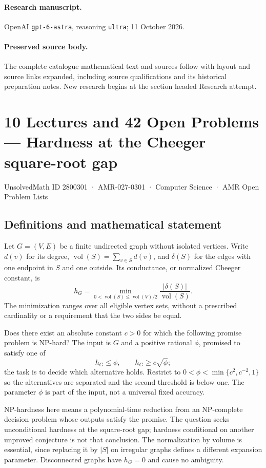 \documentclass[11pt,a4paper]{article}
\begin{document}
\paragraph{Research manuscript.} OpenAI \texttt{gpt-6-astra}, reasoning \texttt{ultra}; 11 October 2026.
\paragraph{Preserved source body.} The complete catalogue mathematical text and sources follow with layout and source links expanded, including source qualifications and its historical preparation notes. New research begins at the section headed Research attempt.

\section*{10 Lectures and 42 Open Problems — Hardness at the Cheeger square-root gap}\label{2800301}
{\small UnsolvedMath ID 2800301 · AMR-027-0301 · Computer Science · AMR Open Problem Lists}
\subsection{Definitions and mathematical statement}
Let $G=(V,E)$ be a finite undirected graph without isolated vertices.
Write $d(v)$ for its degree, $\operatorname{vol}(S)=\sum_{v\in S}d(v)$,
and $\delta(S)$ for the edges with one endpoint in $S$ and one outside.
Its conductance, or normalized Cheeger constant, is
\[
 h_G=\min_{0<\operatorname{vol}(S)\le\operatorname{vol}(V)/2}
                   \frac{|\delta(S)|}{\operatorname{vol}(S)}.
\]
The minimization ranges over all eligible vertex sets, without a
prescribed cardinality or a requirement that the two sides be equal.

Does there exist an absolute constant $c>0$ for which the following
promise problem is NP-hard? The input is $G$ and a positive rational
$\phi$, promised to satisfy one of
\[
                 h_G\le\phi,
                 \qquad h_G\ge c\sqrt\phi;
\]
the task is to decide which alternative holds. Restrict to
$0<\phi<\min\{c^2,c^{-2},1\}$ so the alternatives are separated and
the second threshold is below one. The parameter $\phi$ is part of
the input, not a universal fixed accuracy.

NP-hardness here means a polynomial-time reduction from an NP-complete
decision problem whose outputs satisfy the promise. The question seeks
unconditional hardness at the square-root gap; hardness conditional
on another unproved conjecture is not that conclusion. The normalization
by volume is essential, since replacing it by $|S|$ on irregular graphs
defines a different expansion parameter. Disconnected graphs have
$h_G=0$ and cause no ambiguity.
\end{document}
